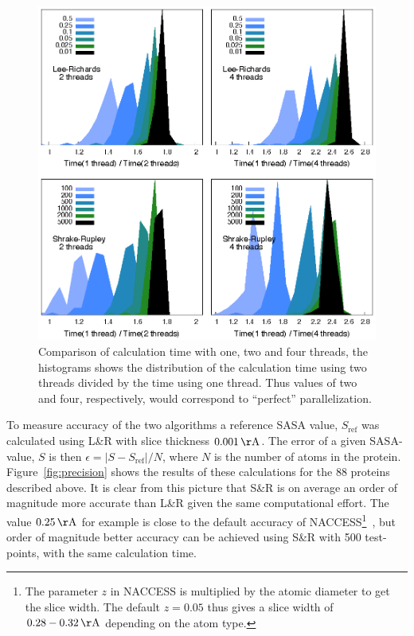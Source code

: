 \documentclass[a4paper,11pt]{article}
\begin{document}
\begin{figure}
  \begin{center}
  \includegraphics{fig/threads} 
  \caption{Comparison of calculation time with one, two and four
    threads, the histograms shows the distribution of the calculation
    time using two threads divided by the time using one thread. Thus
    values of two and four, respectively, would correspond to
    ``perfect'' parallelization.
    \label{fig:threads}}
  \end{center}
\end{figure}

To measure accuracy of the two algorithms a reference SASA value,
$S_\text{ref}$ was calculated using L\&R with slice thickness
$0.001\,\mathrm{\AA}$. The error of a given SASA-value, $S$ is then
$\epsilon = \lvert S - S_\text{ref} \rvert / N$, where $N$ is the
number of atoms in the protein. Figure~\ref{fig:precision} shows the
results of these calculations for the 88 proteins described above.  It
is clear from this picture that S\&R is on average an order of
magnitude more accurate than L\&R given the same computational effort.
The value $0.25\,\mathrm{\AA}$ for example is close to the default
accuracy of NACCESS\footnote{The parameter $z$ in NACCESS is
  multiplied by the atomic diameter to get the slice width. The
  default $z=0.05$ thus gives a slice width of $0.28 -
  0.32\,\mathrm{\AA}$ depending on the atom type.}~\cite{NACCESS}, but
order of magnitude better accuracy can be achieved using S\&R with 500
test-points, with the same calculation time.
\end{document}
